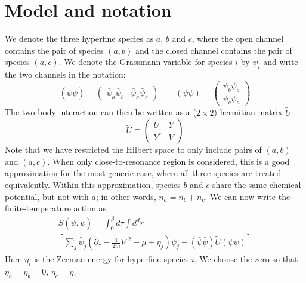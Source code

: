 \documentclass[reprint,pra]{revtex4-1}
\newcommand{\nth}[1]{\ensuremath{\frac{1}{#1}}}
\newcommand{\mbr}[1]{\ensuremath{\left[#1\right]}}
\newcommand{\mtrx}[1]{\ensuremath{\begin{pmatrix}#1\end{pmatrix}}}
\begin{document}
\section{Model and notation\label{sec:model}}
We denote the three hyperfine species as $a$, $b$ and $c$, where the open channel contains the pair of species $(a,b)$ and the closed channel contains the pair of species $(a,c)$.  We denote the Grassmann variable for species $i$ by $\psi_i$ and write the  two channels in the notation:
\begin{equation}
(\bar\psi\bar\psi)=\mtrx{\bar\psi_{a}\bar\psi_{b}&\bar\psi_{a}\bar\psi_{c}}
\qquad(\psi\psi)=\mtrx{\psi_{b}\psi_{a}\\\psi_{c}\psi_{a}}
\end{equation}
The two-body interaction can then be written as a ($2\times2$)  hermitian  matrix  $\tilde{U}$ 
\begin{equation}
\tilde{U}\equiv{}\mtrx{U&Y\\Y^{*}&V}
\end{equation}
 Note that we have restricted the Hilbert space to only include pairs of $(a,b)$ and $(a,c)$.  When only close-to-resonance region is considered, this is a good approximation for the most generic case, where all three species are treated equivalently.  Within this approximation, species $b$ and $c$ share the same chemical potential, but not with $a$; in other words, $n_a=n_b+n_c$.  
  We can now write the finite-temperature action as 
\begin{multline}\label{eq:pathInt2:actionFermi}
S(\bar\psi,\psi)=\int^{\beta}_{0}d\tau\int{d^{d}r}\\
\mbr{\sum_{j}\bar\psi_{j}(\partial_\tau-\nth{2m}\nabla^{2}-\mu+\eta_{j})\psi_{j}
-(\bar\psi\bar\psi)\tilde{U}(\psi\psi)}
\end{multline}
Here $\eta_{i}$ is the Zeeman energy for hyperfine species $i$. We choose the zero so that $\eta_{a}=\eta_{b}=0$, $\eta_{c}=\eta$.    
\end{document}
